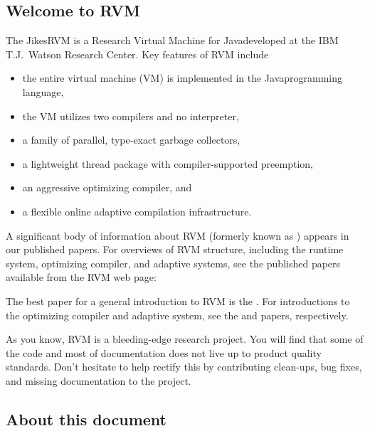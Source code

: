 \subsection {Welcome to RVM}

The Jikes\trademark RVM is a Research Virtual Machine for
Java\trademark developed at the IBM T.J.\ Watson Research Center.  Key
features of RVM include
\begin{itemize}
\item the entire virtual machine (VM) is implemented in the
  Java\trademark  programming language,
\item the VM utilizes two compilers and no interpreter,
\item a family of parallel, type-exact garbage collectors,
\item a lightweight thread package with compiler-supported preemption,
\item an aggressive optimizing compiler, and 
\item a flexible online adaptive compilation infrastructure.
\end{itemize}

A significant body of information about RVM (formerly known as \jp) appears 
in our published
papers.  For overviews of RVM structure, including the runtime system,
optimizing compiler, and adaptive systems, see the published papers
available from the RVM web page:
\begin{quote}
\xlink{{\RVMHomeURL}}{\RVMHomeURL}
\end{quote}

The best paper for a general introduction to RVM is 
the 
.  
For introductions to the
optimizing compiler and adaptive system, see the 
{\JavaGrandePaperURL}
 and 
{\OOPSLAPaperURL}  
papers, respectively.

As you know, RVM is a bleeding-edge research project.  You will find that
some of the code and most of documentation does not live up to product  
quality standards. Don't hesitate to help rectify this by
contributing clean-ups, bug fixes, and missing documentation to 
the project.  
\subsection {About this document}

